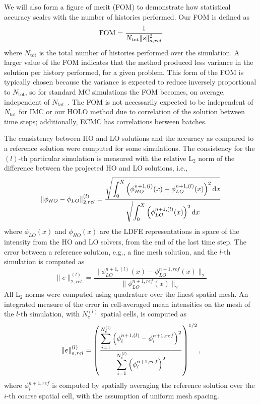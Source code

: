 We will also form a figure of merit (FOM) to demonstrate how statistical accuracy
scales with the number of histories performed.  Our FOM is defined as
\begin{equation}\label{eq:fom}
    \text{FOM} = \frac{1}{N_{\text{tot}}\|s\|_{a,rel}^2}
\end{equation}
where $N_{\text{tot}}$ is the total number of histories performed over the simulation.
A larger value of the FOM indicates that the method produced less variance in the
solution per history performed, for a given problem.  This form of the FOM
is typically chosen because the variance is expected to reduce inversely proportional
to $N_{\text{tot}}$, so for standard MC simulations the FOM becomes, on average, independent of
$N_{tot}$~\cite{shultis_mc}.  The FOM is not necessarily expected to be independent
of $N_{\text{tot}}$ for IMC or
our HOLO method due to correlation of the solution between time steps; additionally, ECMC
has correlations between batches.

The consistency between HO and LO solutions and the accuracy as 
compared to a reference solution were computed for some simulations.
The consistency for the $(l)$-th particular simulation is measured with the relative L$_2$ norm
of the difference between the projected HO and LO solutions, i.e.,
\begin{equation}
    \|\phi_{HO} - \phi_{LO}\|^{(l)}_{2,rel} = \frac{\displaystyle \sqrt{\int_0^X \left(
        \phi_{HO}^{n+1,(l)}(x) - \phi_{LO}^{n+1,(l)}(x) \right)^2 \mathrm{d} x}}{\displaystyle \sqrt{
            \int_0^X \left(\phi_{LO}^{n+1,(l)}(x)\right)^2 \mathrm{d} x }}
\end{equation}
where $\phi_{LO}(x)$ and $\phi_{HO}(x)$ are the LDFE representations in space of the
intensity from the HO and LO solvers, from the end of the last time step.
The error between a reference solution, e.g., a fine mesh solution, and the $l$-th simulation
is computed as
\begin{equation}
    \|e\|^{{(l)}}_{2,rel} = \frac{\|\phi_{LO}^{n+1,{(l)}}(x) -
    \phi_{LO}^{n+1,ref}\left( x \right)\|_2}{\|\phi_{LO}^{n+1,ref}\left( x \right)\|_2}
\end{equation}
All L$_2$ norms were computed using quadrature over the finest spatial mesh.  An
integrated measure of the error in cell-averaged mean intensities on the mesh of the
$l$-th simulation, with $N_c^{(l)}$ spatial cells, is computed as
\begin{equation}
    \|e\|^{{(l)}}_{a,rel} = \left({\frac{\displaystyle \sum\limits_{i=1}^{N^{(l)}_c}
    \left(\phi_i^{n+1,{(l)}} - \phi_i^{n+1,ref}
\right)^2}{\displaystyle \sum\limits_{i=1}^{N^{(l)}_c}\left(\phi_i^{n+1,ref}\right)^2}}\right)^{1/2},
\end{equation}
where $\phi_i^{n+1,ref}$ is computed by spatially averaging the reference solution over
the $i$-th coarse spatial cell, with the assumption of uniform mesh spacing.

